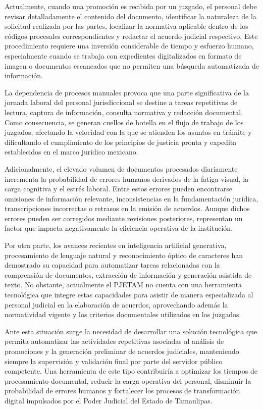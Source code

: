Actualmente, cuando una promoción es recibida por un juzgado, el personal debe revisar detalladamente el contenido del documento, identificar la naturaleza de la solicitud realizada por las partes, localizar la normativa aplicable dentro de los códigos procesales correspondientes y redactar el acuerdo judicial respectivo. Este procedimiento requiere una inversión considerable de tiempo y esfuerzo humano, especialmente cuando se trabaja con expedientes digitalizados en formato de imagen o documentos escaneados que no permiten una búsqueda automatizada de información.

La dependencia de procesos manuales provoca que una parte significativa de la jornada laboral del personal jurisdiccional se destine a tareas repetitivas de lectura, captura de información, consulta normativa y redacción documental. Como consecuencia, se generan cuellos de botella en el flujo de trabajo de los juzgados, afectando la velocidad con la que se atienden los asuntos en trámite y dificultando el cumplimiento de los principios de justicia pronta y expedita establecidos en el marco jurídico mexicano.

Adicionalmente, el elevado volumen de documentos procesados diariamente incrementa la probabilidad de errores humanos derivados de la fatiga visual, la carga cognitiva y el estrés laboral. Entre estos errores pueden encontrarse omisiones de información relevante, inconsistencias en la fundamentación jurídica, transcripciones incorrectas o retrasos en la emisión de acuerdos. Aunque dichos errores pueden ser corregidos mediante revisiones posteriores, representan un factor que impacta negativamente la eficiencia operativa de la institución.

Por otra parte, los avances recientes en inteligencia artificial generativa, procesamiento de lenguaje natural y reconocimiento óptico de caracteres han demostrado su capacidad para automatizar tareas relacionadas con la comprensión de documentos, extracción de información y generación asistida de texto. No obstante, actualmente el PJETAM no cuenta con una herramienta tecnológica que integre estas capacidades para asistir de manera especializada al personal judicial en la elaboración de acuerdos, aprovechando además la normatividad vigente y los criterios documentales utilizados en los juzgados.

Ante esta situación surge la necesidad de desarrollar una solución tecnológica que permita automatizar las actividades repetitivas asociadas al análisis de promociones y la generación preliminar de acuerdos judiciales, manteniendo siempre la supervisión y validación final por parte del servidor público competente. Una herramienta de este tipo contribuiría a optimizar los tiempos de procesamiento documental, reducir la carga operativa del personal, disminuir la probabilidad de errores humanos y fortalecer los procesos de transformación digital impulsados por el Poder Judicial del Estado de Tamaulipas.

